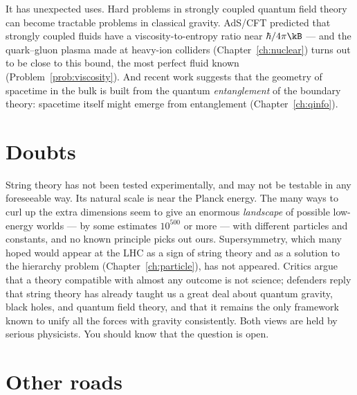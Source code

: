 It has unexpected uses. Hard problems in strongly coupled quantum field theory can become tractable problems in classical gravity. AdS/CFT predicted that strongly coupled fluids have a viscosity-to-entropy ratio near $\hbar/4\pi\kB$ --- and the quark--gluon plasma made at heavy-ion colliders (Chapter~\ref{ch:nuclear}) turns out to be close to this bound, the most perfect fluid known (Problem~\ref{prob:viscosity}). And recent work suggests that the geometry of spacetime in the bulk is built from the quantum \emph{entanglement} of the boundary theory: spacetime itself might emerge from entanglement (Chapter~\ref{ch:qinfo}).

\section{Doubts}

String theory has not been tested experimentally, and may not be testable in any foreseeable way. Its natural scale is near the Planck energy. The many ways to curl up the extra dimensions seem to give an enormous \emph{landscape} of possible low-energy worlds --- by some estimates $10^{500}$ or more --- with different particles and constants, and no known principle picks out ours. Supersymmetry, which many hoped would appear at the LHC as a sign of string theory and as a solution to the hierarchy problem (Chapter~\ref{ch:particle}), has not appeared. Critics argue that a theory compatible with almost any outcome is not science; defenders reply that string theory has already taught us a great deal about quantum gravity, black holes, and quantum field theory, and that it remains the only framework known to unify all the forces with gravity consistently. Both views are held by serious physicists. You should know that the question is open.

\section{Other roads}

